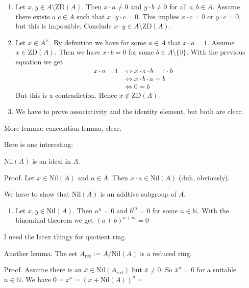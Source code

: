 \documentclass{book}
\theoremstyle{custom_definition}
\begin{document}
    \begin{enumerate}
        \item Let \(x, y \in A \setminus \text{ZD}(A)\). Then \(x \cdot a \neq 0\) and \(y \cdot b \neq 0\) for all \(a, b \in A\). Assume there exists a \(c \in A\) such that \(x \cdot y \cdot c = 0\). This implies \(x \cdot c = 0\) or \(y \cdot c = 0\), but this is impossible. Conclude \(x \cdot y \in A \setminus \text{ZD}(A)\).
        \item Let \(x \in A^\times\). By definition we have for some \(a \in A\) that \(x \cdot a = 1\). Assume \(x \in \text{ZD}(A)\). Then we have \(x \cdot b = 0\) for some \(b \in A \setminus \{0\}\). With the previous equation we get
        \begin{align}
            x \cdot a = 1 & \iff x \cdot a \cdot b = 1 \cdot b \\
            & \iff x \cdot b \cdot a = b \\
            & \iff 0 = b
        \end{align}
        But this is a contradiction. Hence \(x \not\in \text{ZD}(A)\).
        \item We have to prove associativity and the identity element, but both are clear.
    \end{enumerate}

    More lemma: cancelation lemma, clear.

    Here is one interesting:

    \(\text{Nil}(A)\) is an ideal in \(A\).

    Proof. Let \(x \in \text{Nil}(A)\) and \(a \in A\). Then \(x \cdot a \in \text{Nil}(A)\) (duh, obviously).

    We have to show that \(\text{Nil}(A)\) is an addtive subgroup of \(A\).

    \begin{enumerate}
        \item Let \(x, y \in \text{Nil}(A)\). Then \(a^n = 0\) and \(b^m = 0\) for some \(n \in \mathbb{N}\). With the binominal theorem we get \((a + b)^{n + m}= 0\)
    \end{enumerate}

    I need the latex thingy for quotient ring.

    Another lemma. The set \(A_{\text{red}} := A / \text{Nil}(A)\) is a reduced ring.

    Proof. Assume there is an \(\overline{x} \in \text{Nil}(A_{\text{red}})\) but \(\overline{x} \neq 0\). So \(\overline{x}^n = 0\) for a suitable \(n \in \mathbb{N}\). We have \(0 = \overline{x}^n = (x + \text{Nil}(A))^n = \)
\end{document}
